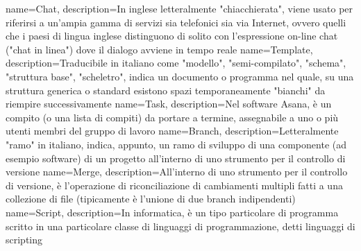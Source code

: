  {
	name=Chat,
	description={In inglese letteralmente "chiacchierata", viene usato per riferirsi a un'ampia gamma
	di servizi sia telefonici sia via Internet, ovvero quelli che i paesi di lingua inglese
	distinguono di solito con l'espressione on-line chat ("chat in linea") dove il dialogo avviene
	in tempo reale}
}
 {
	name=Template,
	description={Traducibile in italiano come "modello", "semi-compilato", "schema", "struttura
	base", "scheletro", indica un documento o programma nel quale, su una struttura
	generica o standard esistono spazi temporaneamente "bianchi" da riempire successivamente}
}
 {
	name=Task,
	description={Nel software Asana, è un compito (o una lista di compiti) da portare a termine,
	assegnabile a uno o più utenti membri del gruppo di lavoro}
}
 {
	name=Branch,
	description={Letteralmente "ramo" in italiano, indica, appunto, un ramo di sviluppo di una
	componente (ad esempio software) di un progetto all'interno di uno strumento per il controllo
	di versione}
}
 {
	name=Merge,
	description={All'interno di uno strumento per il controllo di versione, è l'operazione di
	riconciliazione di cambiamenti multipli fatti a una collezione di file (tipicamente è
	l'unione di due branch indipendenti)}
}
 {
	name=Script,
	description={In informatica, è un tipo particolare di programma scritto in una particolare
	classe di linguaggi di programmazione, detti linguaggi di scripting}
}